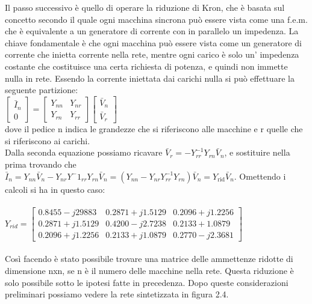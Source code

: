 \documentclass[Lau,noexaminfo]{sapthesis}
\begin{document}
	Il passo successivo è quello di operare la riduzione di Kron, che è basata sul concetto secondo il quale ogni macchina sincrona può essere vista come una f.e.m. che è equivalente a un generatore di corrente con in parallelo un impedenza. La chiave fondamentale è che ogni macchina può essere vista come un generatore di corrente che inietta corrente nella rete, mentre ogni carico è solo un' impedenza costante che costituisce una certa richiesta di potenza, e quindi non immette nulla in rete. Essendo la corrente iniettata dai carichi nulla si può effettuare la seguente partizione:\\
	$\begin{bmatrix}
	\bar{I}_n\\
	0
	\end{bmatrix}=
	\begin{bmatrix}
	Y_{nn} & Y_{nr}\\
	Y_{rn} & Y_{rr}
	\end{bmatrix}
	\begin{bmatrix}
	\bar{V}_n\\
	\bar{V}_r
	\end{bmatrix}$\\
	dove il pedice n indica le grandezze che si riferiscono alle macchine e r quelle che si riferiscono ai carichi.\\
	Dalla seconda equazione possiamo ricavare $\bar{V}_r=-Y^{-1}_{rr}Y_{rn}\bar{V}_n$, e sostituire nella prima trovando che\\
	$\bar{I}_n=Y_{nn}\bar{V}_n-Y_{nr}Y^-1_{rr}Y_{rn}\bar{V}_n=(Y_{nn}-Y_{nr}Y^{-1}_{rr}Y_{rn})\bar{V}_n=Y_{\text{rid}}\bar{V}_n$. Omettendo i calcoli si ha in questo caso:\\\\
	$Y_{rid}=
	\begin{bmatrix}
	0.8455-j29883 & 0.2871+j1.5129 & 0.2096+j1.2256\\
	0.2871+j1.5129 & 0.4200-j2.7238 & 0.2133+1.0879\\
	0.2096+j1.2256 & 0.2133+j1.0879 & 0.2770-j2.3681
	\end{bmatrix}$\\\\
	Così facendo è stato possibile trovare una matrice delle ammettenze ridotte di dimensione nxn, se n è il numero delle macchine nella rete. Questa riduzione è solo possibile sotto le ipotesi fatte in precedenza.
	Dopo queste considerazioni preliminari possiamo vedere la rete sintetizzata in figura 2.4.
\end{document}
